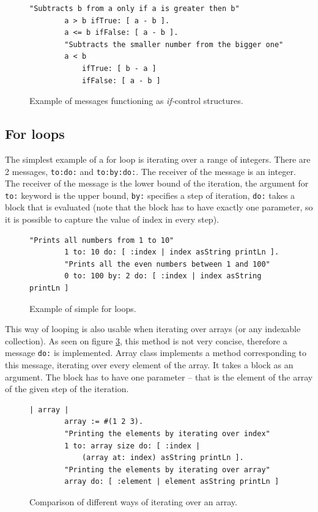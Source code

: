 \documentclass[thesis=M,english]{FITthesis}[2019/12/23]
\begin{document}
\begin{figure}[h!]
	\begin{lstlisting}[language=Smalltalk]
		"Subtracts b from a only if a is greater then b"
		a > b ifTrue: [ a - b ].
		a <= b ifFalse: [ a - b ].
		"Subtracts the smaller number from the bigger one"
		a < b
			ifTrue: [ b - a ]
			ifFalse: [ a - b ]
	\end{lstlisting}
	\caption{Example of messages functioning as \textit{if-}control structures.}
	\label{lst-if-control}
\end{figure}

\subsection{For loops}
The simplest example of a for loop is iterating over a range of integers. There are 2 messages, \texttt{to:do:} and  \texttt{to:by:do:}.
The receiver of the message is an integer. The receiver of the message is the lower bound of the iteration, the argument for \texttt{to:}
keyword is the upper bound, \texttt{by:} specifies a step of iteration, \texttt{do:} takes a block that is evaluated (note that the block
has to have exactly one parameter, so it is possible to capture the value of index in every step).

\begin{figure}[h!]
	\begin{lstlisting}[language=Smalltalk]
		"Prints all numbers from 1 to 10"
		1 to: 10 do: [ :index | index asString printLn ].
		"Prints all the even numbers between 1 and 100"
		0 to: 100 by: 2 do: [ :index | index asString printLn ]
	\end{lstlisting}
	\caption{Example of simple for loops.}
	\label{lst-for-index}
\end{figure}

This way of looping is also usable when iterating over arrays (or any indexable collection). As seen on figure \ref{lst-for-array}, this method is not
very concise, therefore a message \texttt{do:} is implemented. Array class implements a method corresponding to this message, iterating
over every element of the array. It takes a block as an argument. The block has to have one parameter -- that is the element of the array
of the given step of the iteration.

\begin{figure}[h!]
	\begin{lstlisting}[language=Smalltalk]
		| array |
		array := #(1 2 3).
		"Printing the elements by iterating over index"
		1 to: array size do: [ :index |
			(array at: index) asString printLn ].
		"Printing the elements by iterating over array"
		array do: [ :element | element asString printLn ]
	\end{lstlisting}
	\caption{Comparison of different ways of iterating over an array.}
	\label{lst-for-array}
\end{figure}
\end{document}
